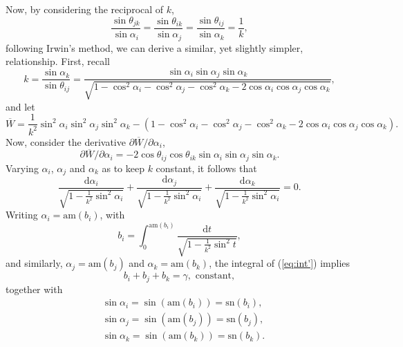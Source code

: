 \documentclass[fleqn,11pt,twoside]{article}
\theoremstyle{definition}
\begin{document}
Now, by considering the reciprocal of $k$,
\begin{equation}
\frac{\sin\theta_{jk}}{\sin\alpha_i}=\frac{\sin\theta_{ik}}{\sin\alpha_j}=\frac{\sin\theta_{ij}}{\sin\alpha_k}=\frac{1}{k},
\end{equation}
following Irwin's method, we can derive a similar, yet slightly simpler, relationship. First, recall
\begin{equation}
k=\frac{\sin\alpha_k}{\sin\theta_{ij}}=\frac{\sin\alpha_i\sin\alpha_j\sin\alpha_k}{\sqrt{1-\cos^2\alpha_i-\cos^2\alpha_j-\cos^2\alpha_k-2\cos\alpha_i\cos\alpha_j\cos\alpha_k}},
\end{equation}
and let
\begin{equation}
\overline{W}=\frac{1}{k^2}\sin^2\alpha_i\sin^2\alpha_j\sin^2\alpha_k-(1-\cos^2\alpha_i-\cos^2\alpha_j-\cos^2\alpha_k-2\cos\alpha_i\cos\alpha_j\cos\alpha_k).
\end{equation}
Now, consider the derivative $\partial\overline{W}/\partial\alpha_i$,
\begin{equation}
\partial\overline{W}/\partial\alpha_i=-2\cos\theta_{ij}\cos\theta_{ik}\sin\alpha_i\sin\alpha_j\sin\alpha_k.
\end{equation}
Varying $\alpha_i$, $\alpha_j$ and $\alpha_k$ as to keep $k$  constant, it follows that
\begin{equation}\label{eq:int'}
\frac{\mathrm{d}\alpha_i}{\sqrt{1-\frac{1}{k^2}\sin^2\alpha_i}}+\frac{\mathrm{d}\alpha_j}{\sqrt{1-\frac{1}{k^2}\sin^2\alpha_i}}+\frac{\mathrm{d}\alpha_k}{\sqrt{1-\frac{1}{k^2}\sin^2\alpha_i}}=0.
\end{equation}
Writing $\alpha_i=\mathrm{am}(b_i)$, with
\begin{equation}
b_i=\int_{0}^{\mathrm{am}(b_i)}\frac{\mathrm{d}t}{\sqrt{1-\frac{1}{k^2}\sin^2t}},
\end{equation}
and similarly, $\alpha_j=\mathrm{am}(b_j)$ and $\alpha_k=\mathrm{am}(b_k)$, the integral of (\ref{eq:int'}) implies
\begin{equation}
b_i+b_j+b_k=\gamma,\,\,\mathrm{constant},
\end{equation}
together with
\begin{equation}
\begin{split}
&\sin\alpha_i=\sin(\mathrm{am}(b_i))=\mathrm{sn}(b_i),\\
&\sin\alpha_j=\sin(\mathrm{am}(b_j))=\mathrm{sn}(b_j),\\
&\sin\alpha_k=\sin(\mathrm{am}(b_k))=\mathrm{sn}(b_k).\\
\end{split}
\end{equation}
\end{document}
